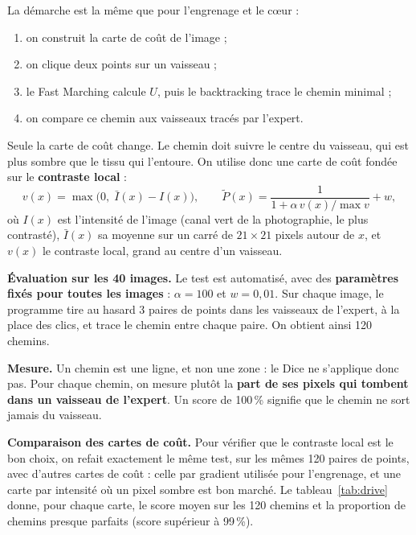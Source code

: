 \documentclass[11pt,a4paper]{article}
\begin{document}
La démarche est la même que pour l'engrenage et le cœur :
\begin{enumerate}[nosep,leftmargin=*]
  \item on construit la carte de coût de l'image ;
  \item on clique deux points sur un vaisseau ;
  \item le Fast Marching calcule $U$, puis le backtracking trace le chemin minimal ;
  \item on compare ce chemin aux vaisseaux tracés par l'expert.
\end{enumerate}
Seule la carte de coût change. Le chemin doit suivre le centre du vaisseau, qui est plus sombre que le tissu
qui l'entoure. On utilise donc une carte de coût fondée sur le \textbf{contraste local} :
\begin{equation}
  v(x) = \max\big(0,\; \bar I(x) - I(x)\big), \qquad
  \tilde P(x) = \frac{1}{1 + \alpha\, v(x)/\max v} + w,
\end{equation}
où $I(x)$ est l'intensité de l'image (canal vert de la photographie, le plus contrasté), $\bar I(x)$ sa
moyenne sur un carré de $21 \times 21$ pixels autour de $x$, et $v(x)$ le contraste local, grand au centre
d'un vaisseau.

\textbf{Évaluation sur les 40 images.} Le test est automatisé, avec des \textbf{paramètres fixés pour toutes
les images} : $\alpha = 100$ et $w = 0{,}01$. Sur chaque image, le programme tire au hasard 3 paires de
points dans les vaisseaux de l'expert, à la place des clics, et trace le chemin entre chaque paire. On
obtient ainsi 120 chemins.

\textbf{Mesure.} Un chemin est une ligne, et non une zone : le Dice ne s'applique donc pas. Pour chaque
chemin, on mesure plutôt la \textbf{part de ses pixels qui tombent dans un vaisseau de l'expert}. Un score de
100\,\% signifie que le chemin ne sort jamais du vaisseau.

\textbf{Comparaison des cartes de coût.} Pour vérifier que le contraste local est le bon choix, on refait
exactement le même test, sur les mêmes 120 paires de points, avec d'autres cartes de coût : celle par
gradient utilisée pour l'engrenage, et une carte par intensité où un pixel sombre est bon marché. Le
tableau~\ref{tab:drive} donne, pour chaque carte, le score moyen sur les 120 chemins et la proportion de
chemins presque parfaits (score supérieur à 99\,\%).
\end{document}
